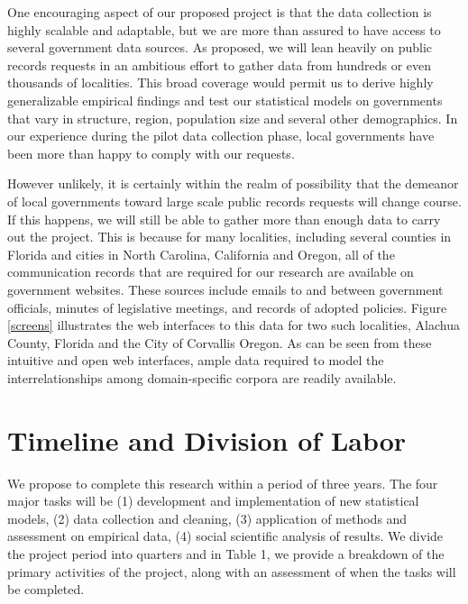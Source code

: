 One encouraging aspect of our proposed project is that the data collection is highly scalable and adaptable, but we are more than assured to have access to several government data sources. As proposed, we will lean heavily on public records requests in an ambitious effort to gather data from hundreds or even thousands of localities. This broad coverage would permit us to derive highly generalizable empirical findings and test our statistical models on governments that vary in structure, region, population size and several other demographics. In our experience during the pilot data collection phase, local governments have been more than happy to comply with our requests.

However unlikely, it is certainly within the realm of possibility that the demeanor of local governments toward large scale public records requests will change course. If this happens, we will still be able to gather more than enough data to carry out the project. This is because for many localities, including several counties in Florida and cities in North Carolina, California and Oregon, all of the communication records that are required for our research are available on government websites. These sources include emails to and between government officials, minutes of legislative meetings, and records of adopted policies. Figure \ref{screens} illustrates the web interfaces to this data for two such localities, Alachua County, Florida and the City of Corvallis Oregon. As can be seen from these intuitive and open web interfaces, ample data required to model the interrelationships among domain-specific corpora are readily available.





\section{Timeline and Division of Labor}

We propose to complete this research within a period of three years. The four major tasks will be (1) development and implementation of new statistical models, (2) data collection and cleaning, (3) application of methods and assessment on empirical data, (4) social scientific analysis of results. We divide the project period into quarters and in Table 1, we provide a breakdown of the primary activities of the project, along with an assessment of when the tasks will be completed.


